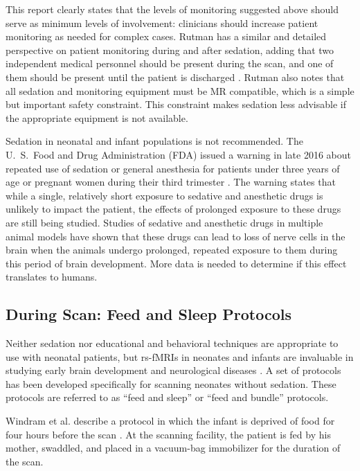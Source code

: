 \noindent This report clearly states that the levels of monitoring suggested above should serve as minimum levels of involvement: clinicians should increase patient monitoring as needed for complex cases. Rutman has a similar and detailed perspective on patient monitoring during and after sedation, adding that two independent medical personnel should be present during the scan, and one of them should be present until the patient is discharged \cite{Rutman2009}. Rutman also notes that all sedation and monitoring equipment must be MR compatible, which is a simple but important safety constraint. This constraint makes sedation less advisable if the appropriate equipment is not available.

Sedation in neonatal and infant populations is not recommended. The  U.~S.~Food and Drug Administration (FDA) issued a warning in late 2016 about repeated use of sedation or general anesthesia for patients under three years of age or pregnant women during their third trimester \cite{FDA2016}. The warning states that while a single, relatively short exposure to sedative and anesthetic drugs is unlikely to impact the patient, the effects of prolonged exposure to these drugs are still being studied. Studies of sedative and anesthetic drugs in multiple animal models have shown that these drugs can lead to loss of nerve cells in the brain when the animals undergo prolonged, repeated exposure to them during this period of brain development. More data is needed to determine if this effect translates to humans.

\subsection{During Scan: Feed and Sleep Protocols}

Neither sedation nor educational and behavioral techniques are appropriate to use with neonatal patients, but rs-fMRIs in neonates and infants are invaluable in studying early brain development and neurological diseases \cite{Smyser2015}. A set of protocols has been developed specifically for scanning neonates without sedation. These protocols are referred to as ``feed and sleep'' or ``feed and bundle'' protocols.

Windram et al. describe a protocol in which the infant is deprived of food for four hours before the scan \cite{Windram2011}. At the scanning facility, the patient is fed by his mother, swaddled, and placed in a vacuum-bag immobilizer for the duration of the scan. 

